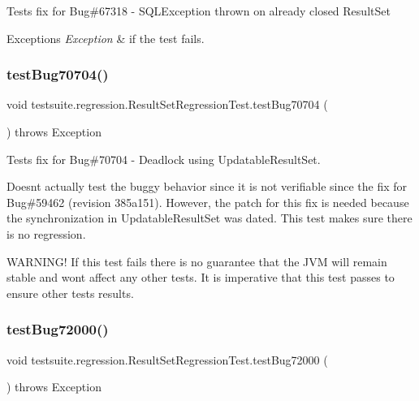 Tests fix for Bug\#67318 -\/ S\+Q\+L\+Exception thrown on already closed Result\+Set


\begin{DoxyExceptions}{Exceptions}
{\em Exception} & if the test fails. \\
\hline
\end{DoxyExceptions}
\mbox{\label{classtestsuite_1_1regression_1_1_result_set_regression_test_adff3e595315840e31279f6e60ea8ae4c}} 
\subsubsection{\texorpdfstring{test\+Bug70704()}{testBug70704()}}
{\footnotesize\ttfamily void testsuite.\+regression.\+Result\+Set\+Regression\+Test.\+test\+Bug70704 (\begin{DoxyParamCaption}{ }\end{DoxyParamCaption}) throws Exception}

Tests fix for Bug\#70704 -\/ Deadlock using Updatable\+Result\+Set.

Doesn\textquotesingle{}t actually test the buggy behavior since it is not verifiable since the fix for Bug\#59462 (revision 385a151). However, the patch for this fix is needed because the synchronization in Updatable\+Result\+Set was dated. This test makes sure there is no regression.

W\+A\+R\+N\+I\+N\+G! If this test fails there is no guarantee that the J\+VM will remain stable and won\textquotesingle{}t affect any other tests. It is imperative that this test passes to ensure other tests results. \mbox{\label{classtestsuite_1_1regression_1_1_result_set_regression_test_ac5cb7a4e2ccabb68566100d643272bb4}} 
\subsubsection{\texorpdfstring{test\+Bug72000()}{testBug72000()}}
{\footnotesize\ttfamily void testsuite.\+regression.\+Result\+Set\+Regression\+Test.\+test\+Bug72000 (\begin{DoxyParamCaption}{ }\end{DoxyParamCaption}) throws Exception}

